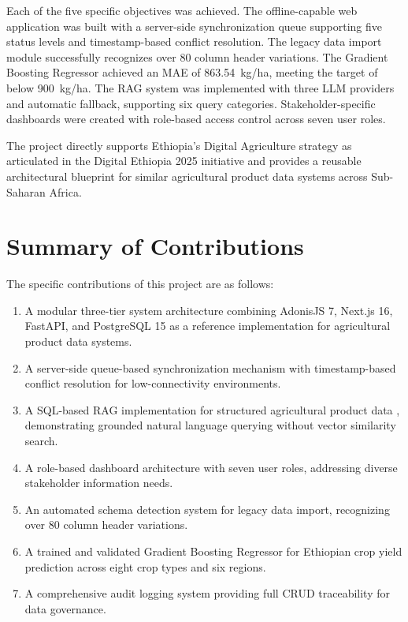 \documentclass[12pt,a4paper,oneside]{report}
\begin{document}
Each of the five specific objectives was achieved. The offline-capable web application was built with a server-side synchronization queue supporting five status levels and timestamp-based conflict resolution. The legacy data import module successfully recognizes over 80 column header variations. The Gradient Boosting Regressor achieved an MAE of 863.54~kg/ha, meeting the target of below 900~kg/ha. The RAG system was implemented with three LLM providers and automatic fallback, supporting six query categories. Stakeholder-specific dashboards were created with role-based access control across seven user roles.

The project directly supports Ethiopia's Digital Agriculture strategy as articulated in the Digital Ethiopia 2025 initiative \cite{digitalethiopia2025} and provides a reusable architectural blueprint for similar agricultural product data systems across Sub-Saharan Africa.

\section{Summary of Contributions}
The specific contributions of this project are as follows:

\begin{enumerate}
  \item A modular three-tier system architecture combining AdonisJS 7, Next.js 16, FastAPI, and PostgreSQL 15 as a reference implementation for agricultural product data systems.
  \item A server-side queue-based synchronization mechanism with timestamp-based conflict resolution for low-connectivity environments.
  \item A SQL-based RAG implementation for structured agricultural product data , demonstrating grounded natural language querying without vector similarity search.
  \item A role-based dashboard architecture with seven user roles, addressing diverse stakeholder information needs.
  \item An automated schema detection system for legacy data import, recognizing over 80 column header variations.
  \item A trained and validated Gradient Boosting Regressor for Ethiopian crop yield prediction across eight crop types and six regions.
  \item A comprehensive audit logging system providing full CRUD traceability for data governance.
\end{enumerate}
\end{document}
